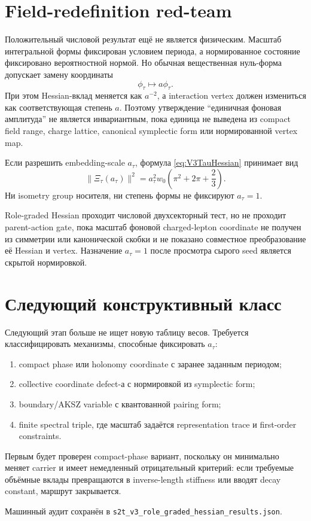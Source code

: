 \section{Field-redefinition red-team}

Положительный числовой результат ещё не является физическим. Масштаб
интегральной формы фиксирован условием периода, а нормированное состояние
фиксировано вероятностной нормой. Но обычная вещественная нуль-форма
допускает замену координаты
\begin{equation}
 \phi_\tau\longmapsto a\phi_\tau.
\end{equation}
При этом Hessian-вклад меняется как \(a^{-2}\), а interaction vertex должен
измениться как соответствующая степень \(a\). Поэтому утверждение
``единичная фоновая амплитуда'' не является инвариантным, пока единица не
выведена из compact field range, charge lattice, canonical symplectic form
или нормированной vertex map.

Если разрешить embedding-scale \(a_\tau\), формула
\eqref{eq:V3TauHessian} принимает вид
\begin{equation}
 \|\Xi_\tau(a_\tau)\|^2
 =a_\tau^2w_0\left(\pi^2+2\pi+\frac23\right).
\end{equation}
Ни isometry group носителя, ни степень формы не фиксируют \(a_\tau=1\).

\begin{nogocriterion}
Role-graded Hessian проходит числовой двухсекторный тест, но не проходит
parent-action gate, пока масштаб фоновой charged-lepton coordinate не
получен из симметрии или канонической скобки и не показано совместное
преобразование её Hessian и vertex. Назначение \(a_\tau=1\) после просмотра
сырого seed является скрытой нормировкой.
\end{nogocriterion}

\section{Следующий конструктивный класс}

Следующий этап больше не ищет новую таблицу весов. Требуется классифицировать
механизмы, способные фиксировать \(a_\tau\):
\begin{enumerate}
 \item compact phase или holonomy coordinate с заранее заданным периодом;
 \item collective coordinate defect-а с нормировкой из symplectic form;
 \item boundary/AKSZ variable с квантованной pairing form;
 \item finite spectral triple, где масштаб задаётся representation trace и
 first-order constraints.
\end{enumerate}
Первым будет проверен compact-phase вариант, поскольку он минимально меняет
carrier и имеет немедленный отрицательный критерий: если требуемые объёмные
вклады превращаются в inverse-length stiffness или вводят decay constant,
маршрут закрывается.

Машинный аудит сохранён в
\texttt{s2t\_v3\_role\_graded\_hessian\_results.json}.